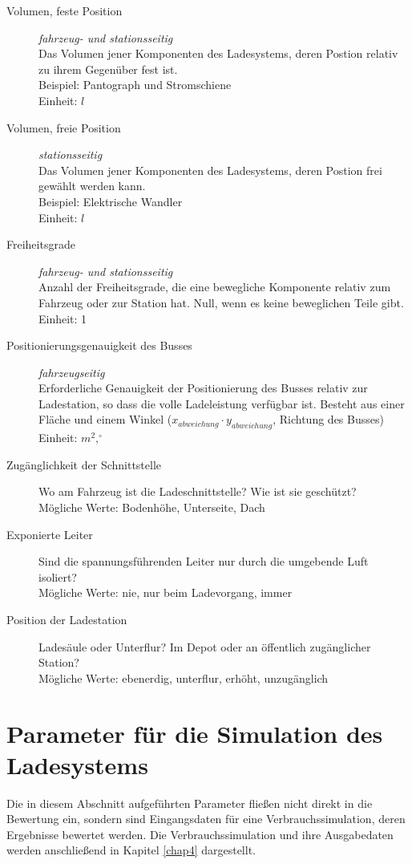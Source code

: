 \begin{description}
	\item [Volumen, feste Position] \emph{fahrzeug- und stationsseitig}\\
	Das Volumen jener Komponenten des Ladesystems, deren Postion relativ zu ihrem Gegenüber fest ist.\\
	Beispiel: Pantograph und Stromschiene\\
	Einheit: $l$
	\item [Volumen, freie Position] \emph{stationsseitig}\\
	Das Volumen jener Komponenten des Ladesystems, deren Postion frei gewählt werden kann.\\
	Beispiel: Elektrische Wandler\\
	Einheit: $l$
	\item [Freiheitsgrade] \emph{fahrzeug- und stationsseitig}\\
	Anzahl der Freiheitsgrade, die eine bewegliche Komponente relativ zum Fahrzeug oder zur Station hat. Null, wenn es keine beweglichen Teile gibt.\\
	Einheit: 1
	\item [Positionierungsgenauigkeit des Busses] \emph{fahrzeugseitig} \\
	Erforderliche Genauigkeit der Positionierung des Busses relativ zur Ladestation, so dass die volle Ladeleistung verfügbar ist. Besteht aus einer Fläche und einem Winkel ($x_{abweichung}\cdot y_{abweichung}$, Richtung des Busses)\\
	Einheit: $m^2,^\circ$
	\item [Zugänglichkeit der Schnittstelle]
	Wo am Fahrzeug ist die Ladeschnittstelle? Wie ist sie geschützt?\\
	Mögliche Werte: Bodenhöhe, Unterseite, Dach
	\item [Exponierte Leiter]
	Sind die spannungsführenden Leiter nur durch die umgebende Luft isoliert?\\
	Mögliche Werte: nie, nur beim Ladevorgang, immer
	\item [Position der Ladestation]
	Ladesäule oder Unterflur? Im Depot oder an öffentlich zugänglicher Station?\\
	Mögliche Werte: ebenerdig, unterflur, erhöht, unzugänglich	
\end{description}

\section{Parameter für die Simulation des Ladesystems}
\label{parameterIndirekt}
Die in diesem Abschnitt aufgeführten Parameter fließen nicht direkt in die Bewertung ein, sondern sind Eingangsdaten für eine Verbrauchssimulation, deren Ergebnisse bewertet werden. Die Verbrauchssimulation und ihre Ausgabedaten werden anschließend in Kapitel \ref{chap4} dargestellt.

